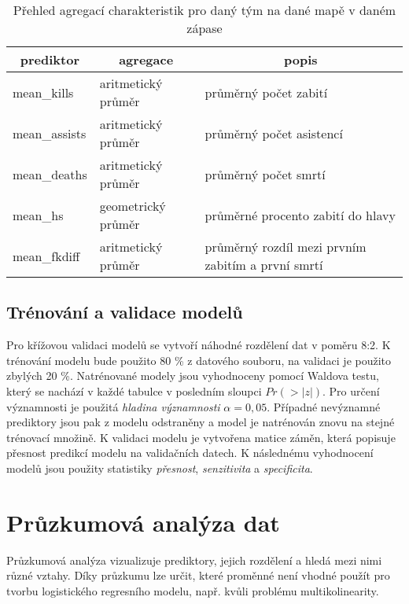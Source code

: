 \begin{table}[H]
    \centering
    \caption{Přehled agregací charakteristik pro daný tým na dané mapě v daném zápase}
    \begin{tabular}{|l|l|l|}
    \hline
    \multicolumn{1}{|c|}{prediktor} & \multicolumn{1}{c|}{agregace} & \multicolumn{1}{c|}{popis}                        \\ \hline
    mean\_kills                     & aritmetický průměr            & průměrný počet zabití                             \\ \hline
    mean\_assists                   & aritmetický průměr            & průměrný počet asistencí                          \\ \hline
    mean\_deaths                    & aritmetický průměr            & průměrný počet smrtí                              \\ \hline
    mean\_hs                        & geometrický průměr            & průměrné procento zabití do hlavy                 \\ \hline
    mean\_fkdiff                    & aritmetický průměr            & průměrný rozdíl mezi prvním zabitím a první smrtí \\ \hline
    \end{tabular}
\end{table}

\subsection{Trénování a validace modelů}
Pro křížovou validaci modelů se vytvoří náhodné rozdělení dat v poměru 8:2. K trénování modelu bude použito 80 \% z datového souboru, na validaci je použito zbylých 20 \%.
Natrénované modely jsou vyhodnoceny pomocí Waldova testu, který se nachází v každé tabulce v posledním sloupci $Pr(>|z|)$. Pro určení významnosti je použitá
\textit{hladina významnosti} $\alpha = 0,05$. Případné nevýznamné prediktory jsou pak z modelu odstraněny a model je natrénován znovu na stejné trénovací množině. K
validaci modelu je vytvořena matice záměn, která popisuje přesnost predikcí modelu na validačních datech. K následnému vyhodnocení modelů jsou použity statistiky
\textit{přesnost}, \textit{senzitivita} a \textit{specificita}. 

\newpage
\section{Průzkumová analýza dat}
Průzkumová analýza vizualizuje prediktory, jejich rozdělení a hledá mezi nimi různé vztahy. Díky průzkumu lze určit, které proměnné není vhodné použít pro tvorbu
logistického regresního modelu, např. kvůli problému multikolinearity.

